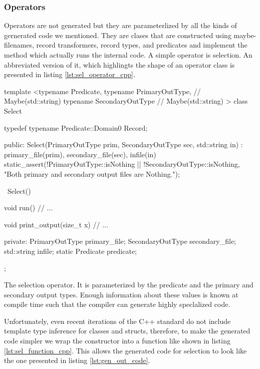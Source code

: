 \subsubsection{Operators}

Operators are not generated but they are parameterlized by all the
kinds of gernerated code we mentioned. They are clases that are
constructed using maybe-filenames, record transformers, record types,
and predicates and implement the  method which actually runs
the internal code. A simple operator is selection. An abbreviated
version of it, which highlingts the shape of an operator class is
presented in listing \ref{lst:sel_operator_cpp}.

\begin{code}
\begin{cppcode}
template <typename Predicate,
          typename PrimaryOutType,   // Maybe(std::string)
          typename SecondaryOutType  // Maybe(std::string)
          >
class Select {
  typedef typename Predicate::Domain0 Record;

public:
  Select(PrimaryOutType prim, SecondaryOutType sec, std::string in)
    : primary_file(prim), secondary_file(sec), infile(in) {
    static_assert(!PrimaryOutType::isNothing || !SecondaryOutType::isNothing,
                  "Both primary and secondary output files are Nothing.");
  }

  ~Select() {}

  void run() {
    // ...
  }

  void print_output(size_t x) {
    // ...
  }

private:
  PrimaryOutType primary_file;
  SecondaryOutType secondary_file;
  std::string infile;
  static Predicate predicate;
};
\end{cppcode}
  \caption{\label{lst:sel_operator_cpp}The selection operator. It is
    parameterized by the predicate and the primary and secondary
    output types. Enough information about these values is known at
    compile time such that the compiler can generate highly
    speclalized code.}
\end{code}

Unfortunately, even recent iterations of the C++ standard do not
include template type inference for classes and structs, therefore, to
make the generated code simpler we wrap the constructor into a
function like shown in listing \ref{lst:sel_function_cpp}. This allows the
generated code for selection to look like the one presented in listing
\ref{lst:gen_out_code}.

